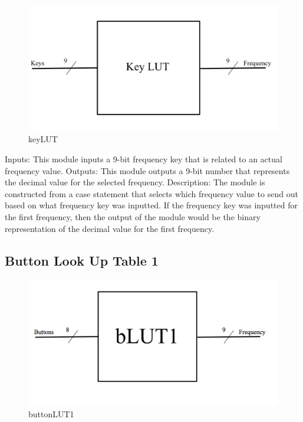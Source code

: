 \documentclass[a4paper]{article}
\begin{document}
\begin{figure}[h]
    \includegraphics[width=6 in]{./Images/jackPictures/keyLUT.png}
    \caption{keyLUT}
    \label{fig:7}
\end{figure}

Inputs: This module inputs a 9-bit frequency key that is related to an actual frequency value.
\newline\newline
Outputs: This module outputs a 9-bit number that represents the decimal value for the selected frequency.
\newline\newline
Description: The module is constructed from a case statement that selects which frequency value to send out based on what frequency key was inputted. If the frequency key was inputted for the first frequency, then the output of the module would be the binary representation of the decimal value for the first frequency.


\subsection{Button Look Up Table 1}

\begin{figure}[h]
    \includegraphics[width=6 in]{./Images/jackPictures/blut1.png}
    \caption{buttonLUT1}
    \label{fig:8}
\end{figure}
\end{document}
